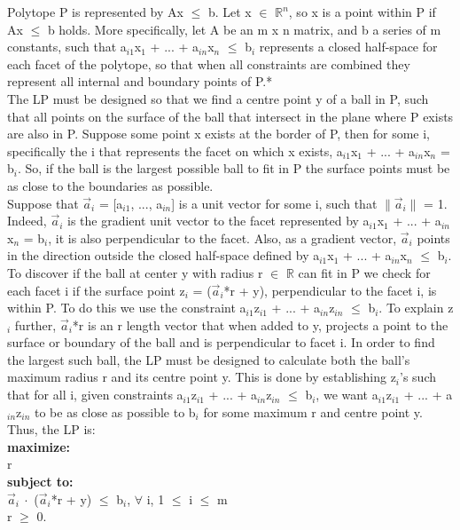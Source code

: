 \documentclass[10pt]{csc_assignment}
\begin{document}
\begin{description}
Polytope P is represented by Ax $\leqslant$ b. Let x $\in$ 
$\mathbb{R}^{n}$, so x is a point within P if Ax $\leqslant$ b holds.
More specifically, let A be an m x n matrix, and b a series of m constants, such that 
a$_{i1}$x$_{1}$ + ... + a$_{in}$x$_{n}$ $\leqslant$ b$_{i}$ represents a closed half-space for each
facet of the polytope, so that when all constraints are combined they represent all 
internal  and boundary points of P.*\\

The LP must be designed so that we find a centre point y of a ball in P, such that all points on the surface of the ball that intersect in the plane where P exists are also in P. Suppose some point x exists at the border of P, then for some i, specifically the i that represents the facet on which x exists, a$_{i1}$x$_{1}$ + ... + a$_{in}$x$_{n}$ = b$_{i}$. So, if the ball is the largest possible ball to fit in P the surface points must be as close to the boundaries as possible.\\

Suppose that $\vec{a}$$_{i}$ = [a$_{i1}$, ..., a$_{in}$] is a unit vector for some i, such that $\lVert$$\vec{a}$$_{i}$$\rVert$ = 1. Indeed, $\vec{a}$$_{i}$ is the gradient unit vector to the facet represented by a$_{i1}$x$_{1}$ + ... + a$_{in}$x$_{n}$ = b$_{i}$, it is also perpendicular to the facet. Also, as a gradient vector, $\vec{a}$$_{i}$ points in the direction outside the closed half-space defined by a$_{i1}$x$_{1}$ + ... + a$_{in}$x$_{n}$ $\leqslant$ b$_{i}$. To discover if the ball at center y with radius r $\in$ $\mathbb{R}$ can fit in P we check for each facet i if the surface point z$_{i}$ = ($\vec{a}$$_{i}$*r + y), perpendicular to the facet i, is within P. To do this we use the constraint a$_{i1}$z$_{i1}$ + ... + a$_{in}$z$_{in}$ $\leqslant$ b$_{i}$. To explain z$_{i}$ further, $\vec{a}$$_{i}$*r is an r length vector that when added to y, projects a point to the surface or boundary of the ball and is perpendicular to facet i. In order to find the largest such ball, the LP must be designed to calculate both the ball's maximum radius r and its centre point y. This is done by establishing z$_{i}$'s such that for all i, given constraints a$_{i1}$z$_{i1}$ + ... + a$_{in}$z$_{in}$ $\leqslant$ b$_{i}$, we want a$_{i1}$z$_{i1}$ + ... + a$_{in}$z$_{in}$ to be as close as possible to b$_{i}$ for some maximum r and centre point y.\\

Thus, the LP is:\\
\textbf{maximize:} \\r\\
\textbf{subject to:} \\
$\vec{a}_{i} ~\cdot$ ($\vec{a}$$_{i}$*r + y) $\leqslant$ b$_{i}$, $\forall$ i, 1 $\leqslant$ i $\leqslant$ m\\ r $\geqslant$ 0.\\


\end{description}
\end{document}
